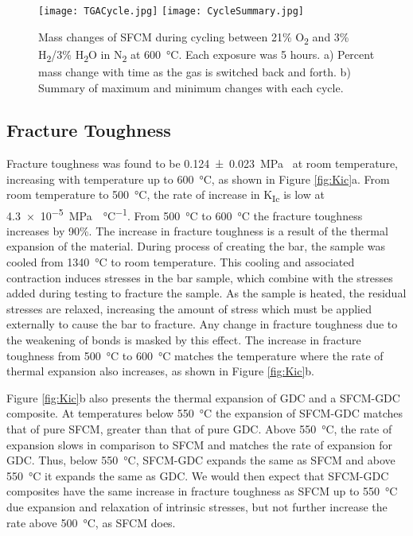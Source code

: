         \begin{figure}
          \texttt{[image: TGACycle.jpg]}
          \texttt{[image: CycleSummary.jpg]}
          \caption{Mass changes of SFCM during cycling between 21\% O\textsubscript{2} and 3\% H\textsubscript{2}/3\% H\textsubscript{2}O in N\textsubscript{2} at \SI{600}{\celsius}. Each exposure was 5 hours. a) Percent mass change with time as the gas is switched back and forth. b) Summary of maximum and minimum changes with each cycle.}
          \label{fig:Cycled}
        \end{figure}

    \subsection{Fracture Toughness}
        Fracture toughness was found to be \SI[separate-uncertainty = true]{0.124 +- 0.023}{\mega\pascal{}} at room temperature, increasing with temperature up to \SI{600}{\celsius}, as shown in Figure \ref{fig:Kic}a.
        From room temperature to \SI{500}{\celsius}, the rate of increase in K\textsubscript{Ic} is low at \SI{4.3e-5}{\mega\pascal{}\per\celsius}.
        From \SI{500}{\celsius} to \SI{600}{\celsius} the fracture toughness increases by 90\%.
        The increase in fracture toughness is a result of the thermal expansion of the material.
        During process of creating the bar, the sample was cooled from \SI{1340}{\celsius} to room temperature.
        This cooling and associated contraction induces stresses in the bar sample, which combine with the stresses added during testing to fracture the sample.
        As the sample is heated, the residual stresses are relaxed, increasing the amount of stress which must be applied externally to cause the bar to fracture.
        Any change in fracture toughness due to the weakening of bonds is masked by this effect.
        The increase in fracture toughness from \SI{500}{\celsius} to \SI{600}{\celsius} matches the temperature where the rate of thermal expansion also increases, as shown in Figure \ref{fig:Kic}b.

        Figure \ref{fig:Kic}b also presents the thermal expansion of GDC and a SFCM-GDC composite.
        At temperatures below \SI{550}{\celsius} the expansion of SFCM-GDC matches that of pure SFCM, greater than that of pure GDC.
        Above \SI{550}{\celsius}, the rate of expansion slows in comparison to SFCM and matches the rate of expansion for GDC.
        Thus, below \SI{550}{\celsius}, SFCM-GDC expands the same as SFCM and above \SI{550}{\celsius} it expands the same as GDC.
        We would then expect that SFCM-GDC composites have the same increase in fracture toughness as SFCM up to \SI{550}{\celsius} due expansion and relaxation of intrinsic stresses, but not further increase the rate above \SI{500}{\celsius}, as SFCM does.

